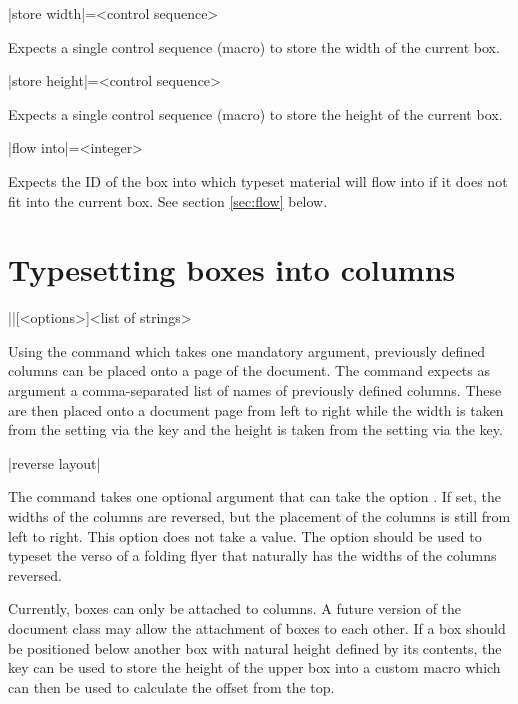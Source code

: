 \documentclass[a4paper]{article}
\begin{document}
\begin{macrodef}
|store width|={<control sequence>}
\end{macrodef}
Expects a single control sequence (macro) to store the width of the current box.

\begin{macrodef}
|store height|={<control sequence>}
\end{macrodef}
Expects a single control sequence (macro) to store the height of the current box.

\begin{macrodef}
|flow into|={<integer>}
\end{macrodef}
Expects the ID of the box into which typeset material will flow into if it does not fit into the current box. See section \ref{sec:flow} below.

\section{Typesetting boxes into columns}

\begin{macrodef}
|\leporellotypesetcolumns|[<options>]{<list of strings>}
\end{macrodef}
Using the command \macro{\leporellotypesetcolumns} which takes one mandatory argument, previously defined columns can be placed onto a page of the document. The command expects as argument a comma-separated list of names of previously defined columns. These are then placed onto a document page from left to right while the width is taken from the setting via the  key and the height is taken from the setting via the  key.

\begin{macrodef}
|reverse layout|
\end{macrodef}
The command takes one optional argument that can take the option . If set, the widths of the columns are reversed, but the placement of the columns is still from left to right. This option does not take a value. The option should be used to typeset the verso of a folding flyer that naturally has the widths of the columns reversed.

Currently, boxes can only be attached to columns. A future version of the document class may allow the attachment of boxes to each other. If a box should be positioned below another box with natural height defined by its contents, the  key can be used to store the height of the upper box into a custom macro which can then be used to calculate the offset from the top.
\end{document}
